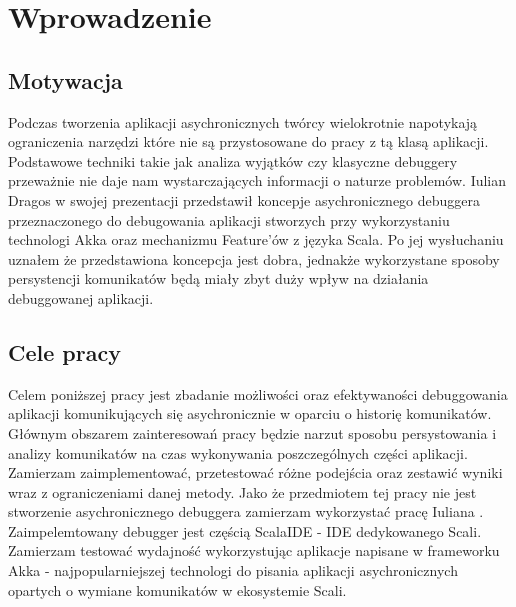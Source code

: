\chapter{Wprowadzenie}


\section{Motywacja}

Podczas tworzenia aplikacji asychronicznych twórcy wielokrotnie napotykają ograniczenia narzędzi które nie są przystosowane do pracy z tą klasą aplikacji. Podstawowe techniki takie jak analiza wyjątków czy klasyczne debuggery przeważnie nie daje nam wystarczających informacji o naturze problemów. Iulian Dragos w swojej prezentacji  \cite{rethingningDebugger} przedstawił koncepje asychronicznego debuggera przeznaczonego do debugowania aplikacji stworzych przy wykorzystaniu technologi Akka oraz mechanizmu Feature'ów z języka Scala. Po jej wysłuchaniu uznałem że przedstawiona koncepcja jest dobra, jednakże wykorzystane sposoby persystencji komunikatów będą miały zbyt duży wpływ na działania debuggowanej aplikacji.



\section{Cele pracy}

Celem poniższej pracy jest zbadanie możliwości oraz efektywaności debuggowania aplikacji komunikujących się asychronicznie w oparciu o historię komunikatów. Głównym obszarem zainteresowań pracy będzie narzut sposobu persystowania i analizy komunikatów na czas wykonywania poszczególnych części aplikacji. Zamierzam zaimplementować, przetestować różne podejścia oraz zestawić wyniki wraz z ograniczeniami danej metody. Jako że przedmiotem tej pracy nie jest stworzenie asychronicznego debuggera zamierzam wykorzystać pracę Iuliana \cite{asychDebuggerGh}. Zaimpelemtowany debugger jest częścią ScalaIDE - IDE dedykowanego Scali. Zamierzam testować wydajność wykorzystując aplikacje napisane w frameworku Akka - najpopularniejszej technologi do pisania aplikacji asychronicznych opartych o wymiane komunikatów w ekosystemie Scali.













